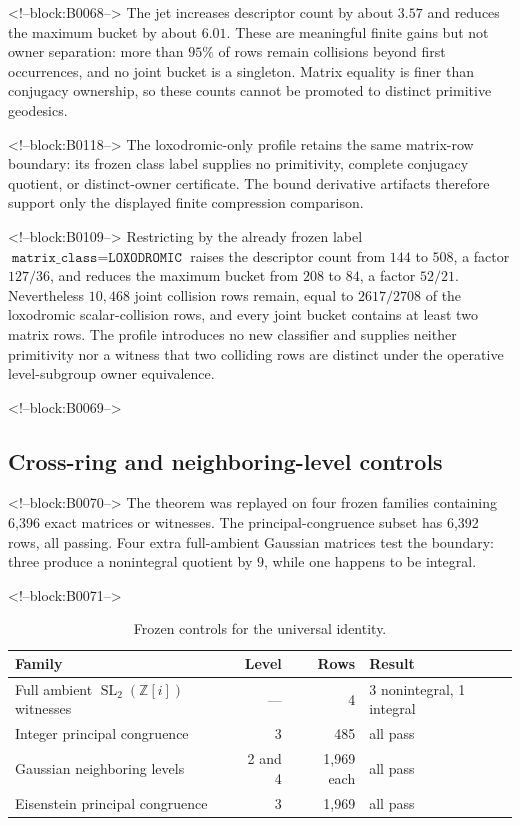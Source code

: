\documentclass[11pt,a4paper]{article}
\theoremstyle{definition}
\theoremstyle{remark}
\newcommand{\SL}{\operatorname{SL}}
\newcommand{\Gauss}{\mathbb{Z}[i]}
\begin{document}
<!--block:B0068-->
The jet increases descriptor count by about \(3.57\) and reduces the maximum bucket by about \(6.01\). These are meaningful finite gains but not owner separation: more than \(95\%\) of rows remain collisions beyond first occurrences, and no joint bucket is a singleton. Matrix equality is finer than conjugacy ownership, so these counts cannot be promoted to distinct primitive geodesics.

<!--block:B0118-->
The loxodromic-only profile retains the same matrix-row boundary: its frozen class label supplies no primitivity, complete conjugacy quotient, or distinct-owner certificate. The bound derivative artifacts therefore support only the displayed finite compression comparison.

<!--block:B0109-->
Restricting by the already frozen label \(\texttt{matrix\_class}=\texttt{LOXODROMIC}\) raises the descriptor count from \(144\) to \(508\), a factor \(127/36\), and reduces the maximum bucket from \(208\) to \(84\), a factor \(52/21\). Nevertheless \(10{,}468\) joint collision rows remain, equal to \(2617/2708\) of the loxodromic scalar-collision rows, and every joint bucket contains at least two matrix rows. The profile introduces no new classifier and supplies neither primitivity nor a witness that two colliding rows are distinct under the operative level-subgroup owner equivalence.

<!--block:B0069-->
\subsection{Cross-ring and neighboring-level controls}

<!--block:B0070-->
The theorem was replayed on four frozen families containing 6,396 exact matrices or witnesses. The principal-congruence subset has 6,392 rows, all passing. Four extra full-ambient Gaussian matrices test the boundary: three produce a nonintegral quotient by \(9\), while one happens to be integral.

<!--block:B0071-->
\begin{table}[t]
\centering
\caption{Frozen controls for the universal identity.}
\label{tab:controls}
\begin{tabular}{lrrl}
\toprule
Family & Level & Rows & Result \\
\midrule
Full ambient \(\SL_2(\Gauss)\) witnesses & --- & 4 & 3 nonintegral, 1 integral \\
Integer principal congruence & 3 & 485 & all pass \\
Gaussian neighboring levels & 2 and 4 & 1,969 each & all pass \\
Eisenstein principal congruence & 3 & 1,969 & all pass \\
\bottomrule
\end{tabular}
\end{table}
\end{document}
